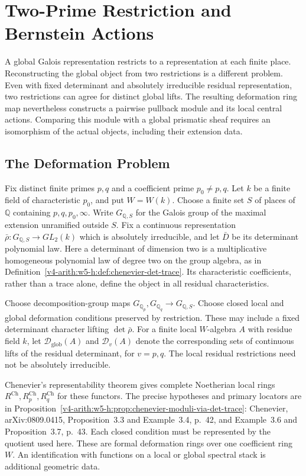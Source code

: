\chapter{Two-Prime Restriction and Bernstein Actions}
\label{v4-arith:bcglue-core}

A global Galois representation restricts to a representation at each
finite place. Reconstructing the global object from two restrictions
is a different problem. Even with fixed determinant and absolutely
irreducible residual representation, two restrictions can agree for
distinct global lifts. The resulting deformation ring map nevertheless
constructs a pairwise pullback module and its local central actions.
Comparing this module with a global prismatic sheaf requires an
isomorphism of the actual objects, including their extension data.

\section{The Deformation Problem}
\label{v4-arith:bcglue-core:statement}
\label{v4-arith:bcglue-core:table}

Fix distinct finite primes $p,q$ and a coefficient prime
$p_0\ne p,q$. Let $k$ be a finite field of characteristic $p_0$,
and put $W=W(k)$. Choose a finite set $S$ of places of $\mathbb Q$
containing $p,q,p_0,\infty$. Write $G_{\mathbb Q,S}$ for the Galois
group of the maximal extension unramified outside $S$.
Fix a continuous representation
$\bar\rho:G_{\mathbb Q,S}\to GL_2(k)$ which is absolutely
irreducible, and let $\bar D$ be its determinant polynomial law.
Here a determinant of dimension two is a multiplicative homogeneous
polynomial law of degree two on the group algebra, as in
Definition~\ref{v4-arith:w5-h:def:chenevier-det-trace}.
Its characteristic coefficients, rather than a trace alone, define
the object in all residual characteristics.

Choose decomposition-group maps
$G_{\mathbb Q_p},G_{\mathbb Q_q}\to G_{\mathbb Q,S}$.
Choose closed local and global deformation conditions preserved by
restriction. These may include a fixed determinant character lifting
$\det\bar\rho$. For a finite local $W$-algebra $A$ with residue
field $k$, let $\mathcal D_{\mathrm{glob}}(A)$ and
$\mathcal D_v(A)$ denote the corresponding sets of continuous
lifts of the residual determinant, for $v=p,q$.
The local residual restrictions need not be absolutely irreducible.

Chenevier's representability theorem gives complete Noetherian local
rings $R^{\mathrm{Ch}},R_p^{\mathrm{Ch}},R_q^{\mathrm{Ch}}$ for
these functors. The precise hypotheses and primary locators are in
Proposition~\ref{v4-arith:w5-h:prop:chenevier-moduli-via-det-trace}:
Chenevier, arXiv:0809.0415, Proposition~3.3 and Example~3.4,
p.~42, and Example~3.6 and Proposition~3.7, p.~43.
Each closed condition must be represented by the quotient used here.
These are formal deformation rings over one coefficient ring $W$.
An identification with functions on a local or global spectral stack
is additional geometric data.

